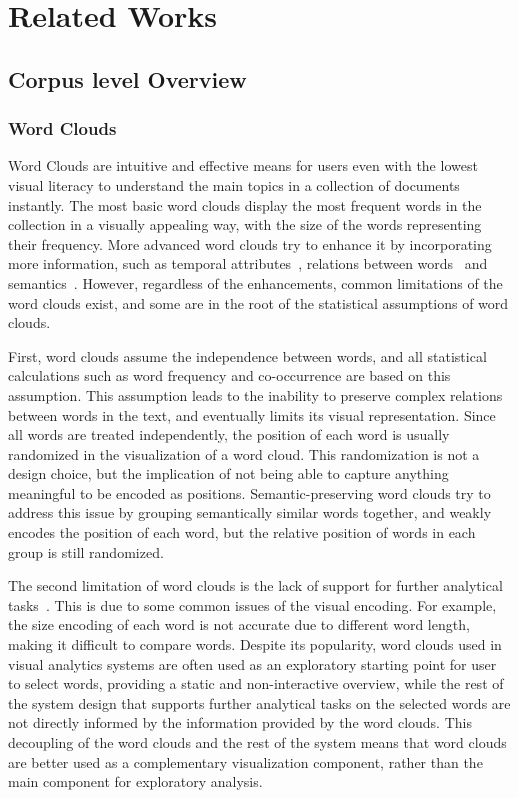 \section{Related Works}
\subsection{Corpus level Overview}
\subsubsection{Word Clouds}
Word Clouds are intuitive and effective means for users even with the lowest visual literacy to understand the main topics in a collection of documents instantly.
The most basic word clouds display the most frequent words in the collection in a visually appealing way, with the size of the words representing their frequency.
More advanced word clouds try to enhance it by incorporating more information, such as temporal attributes~\cite{PyramidTags,SparkClouds}, relations between words~\cite{ParallelTagClouds,WordBridge} and semantics~\cite{SemWordCloudKLM, SemWordification, wang2020Recloud, cui2010context}.
However, regardless of the enhancements, common limitations of the word clouds exist, and some are in the root of the statistical assumptions of word clouds.

First, word clouds assume the independence between words, and all statistical calculations such as word frequency and co-occurrence are based on this assumption.
This assumption leads to the inability to preserve complex relations between words in the text, and eventually limits its visual representation.
Since all words are treated independently, the position of each word is usually randomized in the visualization of a word cloud.
This randomization is not a design choice, but the implication of not being able to capture anything meaningful to be encoded as positions.
Semantic-preserving word clouds try to address this issue by grouping semantically similar words together, and weakly encodes the position of each word,
but the relative position of words in each group is still randomized.

The second limitation of word clouds is the lack of support for further analytical tasks~\cite{viegas2008timelines}.
This is due to some common issues of the visual encoding.
For example, the size encoding of each word is not accurate due to different word length, making it difficult to compare words.
Despite its popularity, word clouds used in visual analytics systems are often used as an exploratory starting point for user to select words,
providing a static and non-interactive overview,
while the rest of the system design that supports further analytical tasks on the selected words are not directly informed by the information provided by the word clouds.
This decoupling of the word clouds and the rest of the system means that word clouds are better used as a complementary visualization component, rather than the main component for exploratory analysis.

